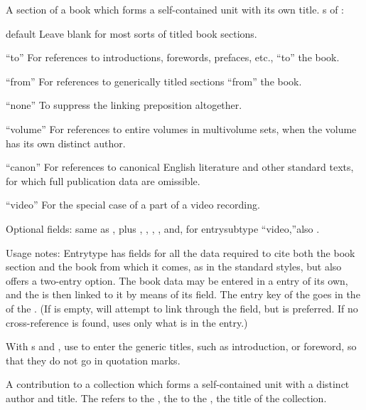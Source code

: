 \documentclass{ltxdockit}[2010/02/12]
\begin{document}
\begin{typelist}
A section of a book which forms a self-contained unit with its own title.
s of :
\begin{valuelist}
\item[default] Leave  blank for most sorts of titled book sections.
\item[``to''] For references to introductions, forewords, prefaces, etc., ``to'' the book.
\item[``from''] For references to generically titled sections ``from'' the book.
\item[``none''] To suppress the linking preposition altogether.
\item[``volume''] For references to entire volumes in multivolume sets, when the volume has its own distinct author.
\item[``canon''] For references to canonical English literature and other standard texts, for which full publication data are omissible.
\item[``video''] For the special case of a part of a video recording.
\end{valuelist}
	
\item Optional fields: same as , plus , , , , and, for entrysubtype ``video,''also .

Usage notes: Entrytype  has fields for all the data required to cite both the book section and the book from which it comes, as in the standard  styles, but  also offers a two-entry option. The book data may be entered in a  entry of its own, and the  is then linked to it by means of its  field. The entry key of the  goes in the  of the . (If  is empty,  will attempt to link through the  field, but  is preferred. If no cross-reference is found,  uses only what is in the  entry.)

With s  and , use  to enter the generic titles, such as introduction, or foreword, so that they do not go in quotation marks. 



A contribution to a collection which forms a self-contained unit with a distinct author and title. The  refers to the , the  to the , \ie the title of the collection.


\end{typelist}
\end{document}
